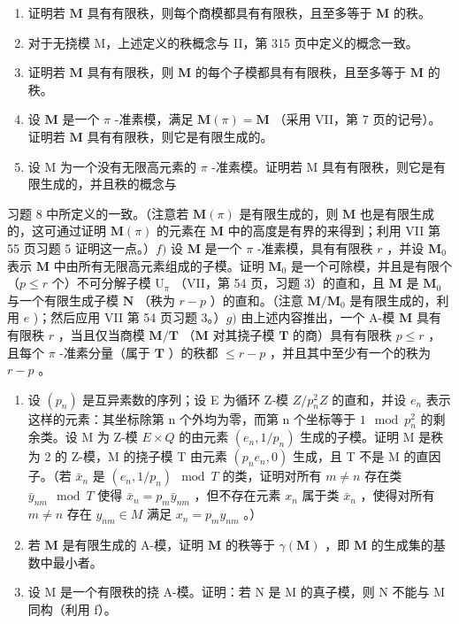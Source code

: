 \begin{enumerate}
\def\labelenumi{\alph{enumi})}
\item
  证明若 \(\mathbf{M}\) 具有有限秩，则每个商模都具有有限秩，且至多等于 \(\mathbf{M}\) 的秩。
\item
  对于无挠模 M，上述定义的秩概念与 II，第 315 页中定义的概念一致。
\item
  证明若 \(\mathbf{M}\) 具有有限秩，则 \(\mathbf{M}\) 的每个子模都具有有限秩，且至多等于 \(\mathbf{M}\) 的秩。
\item
  设 \(\mathbf{M}\) 是一个 \(\pi\) -准素模，满足 \(\mathbf{M}(\pi) = \mathbf{M}\) （采用 VII，第 7 页的记号）。证明若 \(\mathbf{M}\) 具有有限秩，则它是有限生成的。
\item
  设 M 为一个没有无限高元素的 \(\pi\) -准素模。证明若 M 具有有限秩，则它是有限生成的，并且秩的概念与
\end{enumerate}

习题 8 中所定义的一致。（注意若 \(\mathbf{M}(\pi)\) 是有限生成的，则 \(\mathbf{M}\) 也是有限生成的，这可通过证明 \(\mathbf{M}(\pi)\) 的元素在 \(\mathbf{M}\) 中的高度是有界的来得到；利用 VII 第 55 页习题 5 证明这一点。）\(f)\) 设 \(\mathbf{M}\) 是一个 \(\pi\) -准素模，具有有限秩 \(r\) ，并设 \(\mathbf{M}_0\) 表示 \(\mathbf{M}\) 中由所有无限高元素组成的子模。证明 \(\mathbf{M}_0\) 是一个可除模，并且是有限个（\(p \leqslant r\) 个）不可分解子模 \(\mathrm{U}_{\pi}\) （VII，第 54 页，习题 3）的直和，且 \(\mathbf{M}\) 是 \(\mathbf{M}_0\) 与一个有限生成子模 \(\mathbf{N}\) （秩为 \(r - p\) ）的直和。（注意 \(\mathbf{M} / \mathbf{M}_0\) 是有限生成的，利用 \(e\) )；然后应用 VII 第 54 页习题 3。）\(g)\) 由上述内容推出，一个 A-模 \(\mathbf{M}\) 具有有限秩 \(r\) ，当且仅当商模 \(\mathbf{M} / \mathbf{T}\) （\(\mathbf{M}\) 对其挠子模 \(\mathbf{T}\) 的商）具有有限秩 \(p \leqslant r\) ，且每个 \(\pi\) -准素分量（属于 \(\mathbf{T}\) ）的秩都 \(\leqslant r - p\) ，并且其中至少有一个的秩为 \(r - p\) 。

\begin{enumerate}
\def\labelenumi{\alph{enumi})}
\setcounter{enumi}{7}
\item
  设 \((p_{n})\) 是互异素数的序列；设 E 为循环 Z-模 \(Z/p_{n}^{2}Z\) 的直和，并设 \(e_{n}\) 表示这样的元素：其坐标除第 n 个外均为零，而第 n 个坐标等于 \(1 \mod p_{n}^{2}\) 的剩余类。设 M 为 Z-模 \(E \times Q\) 的由元素 \((e_{n}, 1/p_{n})\) 生成的子模。证明 M 是秩为 2 的 Z-模，M 的挠子模 T 由元素 \((p_{n}e_{n}, 0)\) 生成，且 T 不是 M 的直因子。（若 \(\bar{x}_{n}\) 是 \((e_{n}, 1/p_{n}) \mod T\) 的类，证明对所有 \(m \neq n\) 存在类 \(\bar{y}_{nm} \mod T\) 使得 \(\bar{x}_{n} = p_{m}\bar{y}_{nm}\) ，但不存在元素 \(x_{n}\) 属于类 \(\bar{x}_{n}\) ，使得对所有 \(m \neq n\) 存在 \(y_{nm} \in M\) 满足 \(x_{n} = p_{m}y_{nm}\) 。）
\item
  若 \(\mathbf{M}\) 是有限生成的 A-模，证明 \(\mathbf{M}\) 的秩等于 \(\gamma (\mathbf{M})\) ，即 \(\mathbf{M}\) 的生成集的基数中最小者。
\item
  设 M 是一个有限秩的挠 A-模。证明：若 N 是 M 的真子模，则 N 不能与 M 同构（利用 f）。
\end{enumerate}

